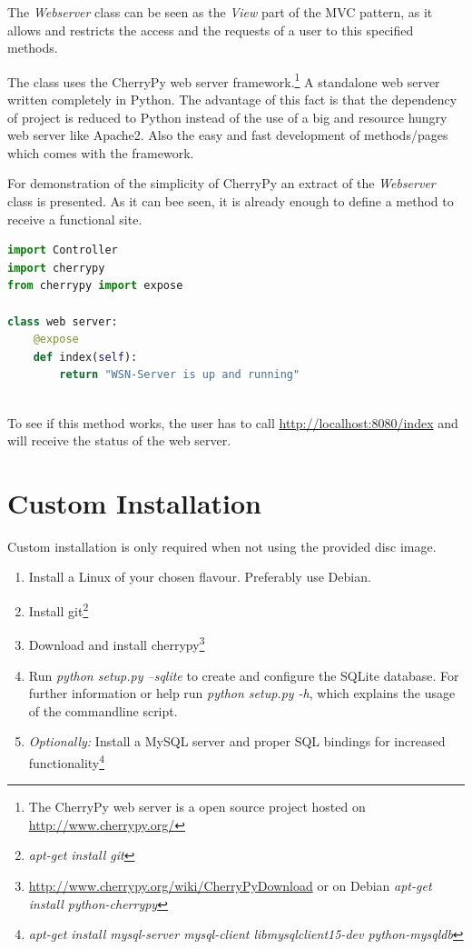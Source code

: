 The \textit{Webserver} class can be seen as the \textit{View} part of the MVC pattern, as it allows and restricts the access and the requests of a user to this specified methods.

The class uses the CherryPy web server framework.\footnote{The CherryPy web server is a open source project hosted on \url{http://www.cherrypy.org/}} A standalone web server written completely in Python. The advantage of this fact is that the dependency of project is reduced to Python instead of the use of a big and resource hungry web server like Apache2. Also the easy and fast development of methods/pages which comes with the framework.

For demonstration of the simplicity of CherryPy an extract of the \textit{Webserver} class is presented. As it can bee seen, it is already enough to define a method to receive a functional site. 
\begin{lstlisting}[language=Python]
import Controller
import cherrypy
from cherrypy import expose

class web server:
    @expose
    def index(self):
        return "WSN-Server is up and running"
       
\end{lstlisting}

To see if this method works, the user has to call \url{http://localhost:8080/index} and will receive the status of the web server.


\section{Custom Installation}
\label{sec:install}

Custom installation is only required when not using the provided disc image.

\begin{enumerate}
    \item Install a Linux of your chosen flavour. Preferably use Debian.
    \item Install git\footnote{\textit{apt-get install git}}
    \item Download and install cherrypy\footnote{\url{http://www.cherrypy.org/wiki/CherryPyDownload} or on Debian \textit{apt-get install python-cherrypy}}
    \item Run \textit{python setup.py --sqlite} to create and configure the SQLite database. For further information or help run \textit{python setup.py -h}, which explains the usage of the commandline script.
    \item \textit{Optionally:} Install a MySQL server and proper SQL bindings for increased functionality\footnote{\textit{apt-get install mysql-server mysql-client libmysqlclient15-dev python-mysqldb}}
\end{enumerate}

